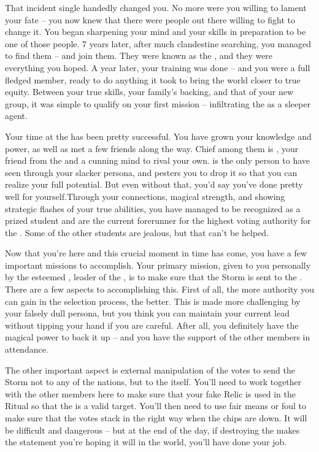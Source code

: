 \documentclass[char]{GL2020}
\begin{document}
That incident single handedly changed you. No more were you willing to lament your fate -- you now knew that there were people out there willing to fight to change it. You began sharpening your mind and your skills in preparation to be one of those people. 7 years later, after much clandestine searching, you managed to find them -- and join them. They were known as the \pGoaties{}, and they were everything you hoped. A year later, your training was done -- and you were a full fledged member, ready to do anything it took to bring the world closer to true equity. Between your true skills, your family’s backing, and that of your new group, it was simple to qualify on your first mission -- infiltrating the \pSchool{} as a sleeper agent.
 
Your time at the \pSc{} has been pretty successful. You have grown your knowledge and power, as well as met a few friends along the way. Chief among them is \cAmbition{}, your friend from the \pTech{} and a cunning mind to rival your own. \cAmbition{} is the only person to have seen through your slacker persona, and pesters you to drop it so that you can realize your full potential. But even without that, you’d say you’ve done pretty well for yourself.Through your connections, magical strength, and showing strategic flashes of your true abilities, you have managed to be recognized as a prized student and are the current forerunner for the highest voting authority for the \pFarm{}. Some of the other students are jealous, but that can’t be helped.
 
Now that you’re here and this crucial moment in time has come, you have a few important missions to accomplish. Your primary mission, given to you personally by the esteemed \cChupLeader{}, leader of the \pGoaties{}, is to make sure that the Storm is sent to the \pSc{}. There are a few aspects to accomplishing this. First of all, the more authority you can gain in the selection process, the better. This is made more challenging by your falsely dull persona, but you think you can maintain your current lead without tipping your hand if you are careful. After all, you definitely have the magical power to back it up -- and you have the support of the other members in attendance. 
 
The other important aspect is external manipulation of the votes to send the Storm not to any of the nations, but to the \pSc{} itself. You’ll need to work together with the other members here to make sure that your fake Relic is used in the Ritual so that the \pSc{} is a valid target. You’ll then need to use fair means or foul to make sure that the votes stack in the right way when the chips are down. It will be difficult and dangerous -- but at the end of the day, if destroying the \pSc{} makes the statement you’re hoping it will in the world, you’ll have done your job.
 
\end{document}
